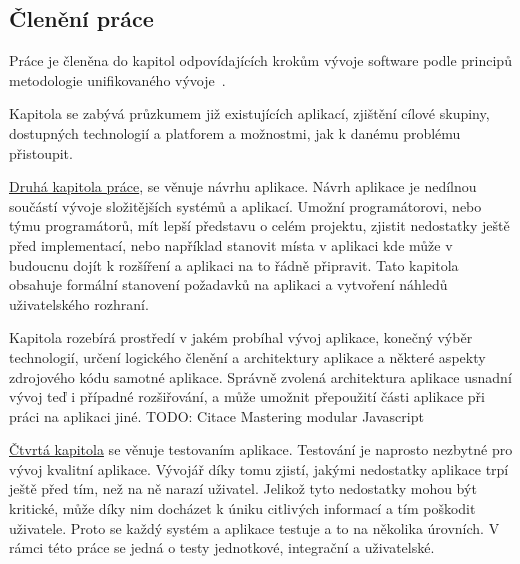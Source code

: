 \begin{introduction}
    \section{Členění práce}
    Práce je členěna do kapitol odpovídajících krokům vývoje software podle principů metodologie unifikovaného vývoje~\cite[s.~51‑68]{arlow_2007_uml}.

    Kapitola  se zabývá průzkumem již existujících aplikací, zjištění cílové skupiny, dostupných technologií a platforem a možnostmi, jak k danému problému přistoupit.

    \hyperref[ch:design]{Druhá kapitola práce}, se věnuje návrhu aplikace. Návrh aplikace je nedílnou součástí vývoje složitějších systémů a aplikací. Umožní programátorovi, nebo týmu programátorů, mít lepší představu o celém projektu, zjistit nedostatky ještě před implementací, nebo například stanovit místa v aplikaci kde může v budoucnu dojít k rozšíření a aplikaci na to řádně připravit. Tato kapitola obsahuje formální stanovení požadavků na aplikaci a vytvoření náhledů uživatelského rozhraní.

    Kapitola  rozebírá prostředí v jakém probíhal vývoj aplikace, konečný výběr technologií, určení logického členění a architektury aplikace a některé aspekty zdrojového kódu samotné aplikace. Správně zvolená architektura aplikace usnadní vývoj teď i případné rozšiřování, a může umožnit přepoužití části aplikace při práci na aplikaci jiné. TODO: Citace Mastering modular Javascript

    \hyperref[ch:testing]{Čtvrtá kapitola} se věnuje testovaním aplikace. Testování je naprosto nezbytné pro vývoj kvalitní aplikace. Vývojář díky tomu zjistí, jakými nedostatky aplikace trpí ještě před tím, než na ně narazí uživatel. Jelikož tyto nedostatky mohou být kritické, může díky nim docházet k úniku citlivých informací a tím poškodit uživatele. Proto se každý systém a aplikace testuje a to na několika úrovních. V rámci této práce se jedná o testy jednotkové, integrační a uživatelské.
\end{introduction}